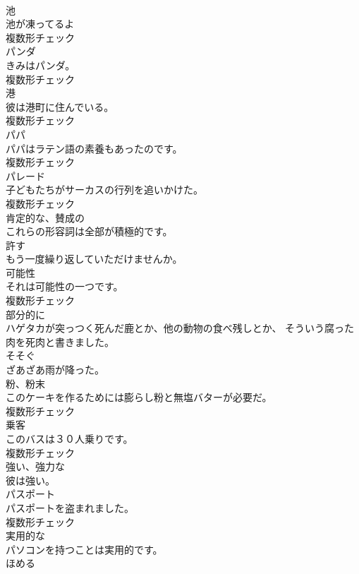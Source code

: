 \documentclass[8pt]{extreport}
\begin{document}
\begin{CJK}{UTF8}{min}
\\	[名詞]	池	
\\	池が凍ってるよ	
\\	複数形チェック
\\	[名詞]	パンダ	
\\	きみはパンダ。	
\\	複数形チェック
\\	[名詞]	港	
\\	彼は港町に住んでいる。	
\\	複数形チェック
\\	[名詞]	パパ	
\\	パパはラテン語の素養もあったのです。	
\\	複数形チェック
\\	[名詞]	パレード	
\\	子どもたちがサーカスの行列を追いかけた。	
\\	複数形チェック
\\	[形容詞]	肯定的な、賛成の	
\\	これらの形容詞は全部が積極的です。	
\\	[動詞]	許す	
\\	もう一度繰り返していただけませんか。	
\\	[名詞]	可能性	
\\	それは可能性の一つです。	
\\	複数形チェック
\\	[副詞]	部分的に	
\\	ハゲタカが突っつく死んだ鹿とか、他の動物の食べ残しとか、 そういう腐った肉を死肉と書きました。	
\\	[動詞]	そそぐ	
\\	ざあざあ雨が降った。	
\\	[名詞]	粉、粉末	
\\	このケーキを作るためには膨らし粉と無塩バターが必要だ。	
\\	複数形チェック
\\	[名詞]	乗客	
\\	このバスは３０人乗りです。	
\\	複数形チェック
\\	[形容詞]	強い、強力な	
\\	彼は強い。	
\\	[名詞]	パスポート	
\\	パスポートを盗まれました。	
\\	複数形チェック
\\	[形容詞]	実用的な	
\\	パソコンを持つことは実用的です。	
\\	[動詞]	ほめる	

\end{CJK}
\end{document}
